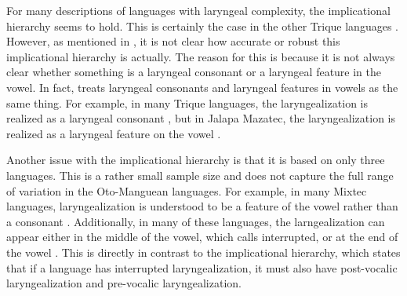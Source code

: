 For many descriptions of languages with laryngeal complexity, the implicational hierarchy seems to hold. This is certainly the case in the other Trique languages \citep{dicanioPhoneticsPhonologySan2008,dicanioItunyosoTrique2010,dicanioCoarticulationToneGlottal2012,dicanioPhoneticsFortisLenis2012,dicanioCueWeightPerception2014,dicanioGlottalTogglingItunyoso2020,elliottChicahuaxtlaTriqui2016,hollenbachPhonologyMorphologyTone1984}. However, as mentioned in \citet{frazierPhoneticsYucatecMaya2013}, it is not clear how accurate or robust this implicational hierarchy is actually. The reason for this is because it is not always clear whether something is a laryngeal consonant or a laryngeal feature in the vowel. In fact, \citet{silvermanLaryngealComplexityOtomanguean1997,silvermanPhasingRecoverability1997} treats laryngeal consonants and laryngeal features in vowels as the same thing. For example, in many Trique languages, the laryngealization is realized as a laryngeal consonant \citep{dicanioPhoneticsPhonologySan2008,dicanioItunyosoTrique2010,dicanioCoarticulationToneGlottal2012,dicanioPhoneticsFortisLenis2012,dicanioCueWeightPerception2014,dicanioGlottalTogglingItunyoso2020,elliottChicahuaxtlaTriqui2016,hollenbachPhonologyMorphologyTone1984}, but in Jalapa Mazatec, the laryngealization is realized as a laryngeal feature on the vowel \citep{kirkQuantifyingAcousticProperties1993,garellekAcousticConsequencesPhonation2011}. 

Another issue with the implicational hierarchy is that it is based on only three languages. This is a rather small sample size and does not capture the full range of variation in the Oto-Manguean languages. For example, in many Mixtec languages, laryngealization is understood to be a feature of the vowel rather than a consonant \citep[e.g.,][]{cortesSanSebastianMonte2023,eischensTonePhonationPhonologyPhonetics2022,gerfenPhonologyPhoneticsCoatzospan1999,gerfenProductionPerceptionLaryngealized2005}. Additionally, in many of these languages, the larngealization can appear either in the middle of the vowel, which \citet{silvermanLaryngealComplexityOtomanguean1997} calls interrupted, or at the end of the vowel \citep[e.g.,][]{cortesSanSebastianMonte2023,eischensTonePhonationPhonologyPhonetics2022}. This is directly in contrast to the implicational hierarchy, which states that if a language has interrupted laryngealization, it must also have post-vocalic laryngealization and pre-vocalic laryngealization.

